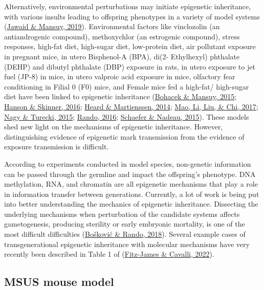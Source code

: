 \documentclass[12pt,twoside]{reedthesis}
\begin{document}
Alternatively, environmental perturbations may initiate epigenetic
inheritance, with various insults leading to offspring phenotypes in a
variety of model systems (\protect\hyperlink{ref-jawaid2019}{Jawaid \& Mansuy, 2019}). Environmental factors like
vinclozolin (an antiandrogenic compound), methoxychlor (an estrogenic
compound), stress responses, high-fat diet, high-sugar diet, low-protein
diet, air pollutant exposure in pregnant mice, in utero Bisphenol-A
(BPA), di(2- Ethylhexyl) phthalate (DEHP) and dibutyl phthalate (DBP)
exposure in rats, in utero exposure to jet fuel (JP-8) in mice, in utero
valproic acid exposure in mice, olfactory fear conditioning in Filial 0
(F0) mice, and Female mice fed a high-fat/ high-sugar diet have been
linked to epigenetic inheritance (\protect\hyperlink{ref-bohacek2015}{Bohacek \& Mansuy, 2015}; \protect\hyperlink{ref-hanson2016}{Hanson \& Skinner, 2016}; \protect\hyperlink{ref-heard2014}{Heard \& Martienssen, 2014}; \protect\hyperlink{ref-mao2017}{Mao, Li, Liu, \& Chi, 2017}; \protect\hyperlink{ref-nagy2015}{Nagy \& Turecki, 2015}; \protect\hyperlink{ref-rando2016}{Rando, 2016}; \protect\hyperlink{ref-schaefer2015}{Schaefer \& Nadeau, 2015}). These models shed new
light on the mechanisms of epigenetic inheritance. However,
distinguishing evidence of epigenetic mark transmission from the
evidence of exposure transmission is difficult.

According to experiments conducted in model species, non-genetic
information can be passed through the germline and impact the
offspring's phenotype. DNA methylation, RNA, and chromatin are all
epigenetic mechanisms that play a role in information transfer between
generations. Currently, a lot of work is being put into better
understanding the mechanics of epigenetic inheritance. Dissecting the
underlying mechanisms when perturbation of the candidate systems affects
gametogenesis, producing sterility or early embryonic mortality, is one
of the most difficult difficulties (\protect\hyperlink{ref-bokovi2018}{Bošković \& Rando, 2018}). Several example cases
of transgenerational epigenetic inheritance with molecular mechanisms
have very recently been described in Table 1 of (\protect\hyperlink{ref-fitz-james2022}{Fitz-James \& Cavalli, 2022}).

\hypertarget{msus-mouse-model}{%
\subsection*{MSUS mouse model}\label{msus-mouse-model}}
\end{document}
